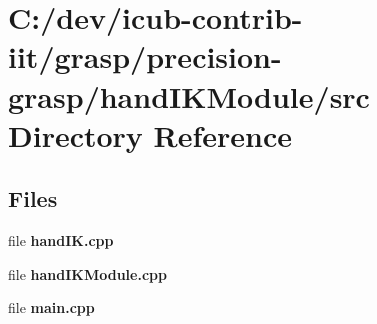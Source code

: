 \section{C\+:/dev/icub-\/contrib-\/iit/grasp/precision-\/grasp/hand\+I\+K\+Module/src Directory Reference}
\label{dir_42770607c53a71cb5927aec33c7cba76}
\subsection*{Files}
\begin{DoxyCompactItemize}
\item 
file {\bfseries hand\+I\+K.\+cpp}
\item 
file {\bfseries hand\+I\+K\+Module.\+cpp}
\item 
file {\bfseries main.\+cpp}
\end{DoxyCompactItemize}

